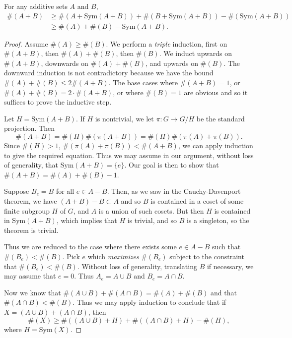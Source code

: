 \begin{theorem}
    For any additive sets $A$ and $B$,
    \begin{align*}
        \#(A + B) &\geq \#(A + \text{Sym}(A + B)) + \#(B + \text{Sym}(A + B)) - \#(\text{Sym}(A+B))\\
        &\geq \#(A) + \#(B) - \text{Sym}(A+B).
    \end{align*}
\end{theorem}
\begin{proof}
    Assume $\#(A) \geq \#(B)$. We perform a \emph{triple} induction, first on $\#(A + B)$, then $\#(A) + \#(B)$, then $\#(B)$. We induct upwards on $\#(A + B)$, downwards on $\#(A) + \#(B)$, and upwards on $\#(B)$. The downward induction is not contradictory because we have the bound $\#(A) + \#(B) \leq 2 \#(A + B)$. The base cases where $\#(A + B) = 1$, or $\#(A) + \#(B) = 2 \cdot \#(A + B)$, or where $\#(B) = 1$ are obvious and so it suffices to prove the inductive step.

    Let $H = \text{Sym}(A + B)$. If $H$ is nontrivial, we let $\pi: G \to G/H$ be the standard projection. Then
    \[ \#(A + B) = \#(H) \#(\pi(A + B)) = \#(H) \#(\pi(A) + \pi(B)). \]
    Since $\#(H) > 1$, $\#(\pi(A) + \pi(B)) < \#(A + B)$, we can apply induction to give the required equation. Thus we may assume in our argument, without loss of generality, that $\text{Sym}(A + B) = \{ e \}$. Our goal is then to show that $\#(A + B) = \#(A) + \#(B) - 1$.

    Suppose $B_e = B$ for all $e \in A - B$. Then, as we saw in the Cauchy-Davenport theorem, we have $(A + B) - B \subset A$ and so $B$ is contained in a coset of some finite subgroup $H$ of $G$, and $A$ is a union of such cosets. But then $H$ is contained in $\text{Sym}(A + B)$, which implies that $H$ is trivial, and so $B$ is a singleton, so the theorem is trivial.

    Thus we are reduced to the case where there exists some $e \in A - B$ such that $\#(B_e) < \#(B)$. Pick $e$ which \emph{maximizes} $\#(B_e)$ subject to the constraint that $\#(B_e) < \#(B)$. Without loss of generality, translating $B$ if necessary, we may assume that $e = 0$. Thus $A_e = A \cup B$ and $B_e = A \cap B$.

    Now we know that $\#(A \cup B) + \#(A \cap B) = \#(A) + \#(B)$ and that $\#(A \cap B) < \#(B)$. Thus we may apply induction to conclude that if $X = (A \cup B) + (A \cap B)$, then
    \[ \#(X) \geq \#((A \cup B) + H) + \#((A \cap B) + H) - \#(H), \]
    where $H = \text{Sym}(X)$.


\end{proof}
